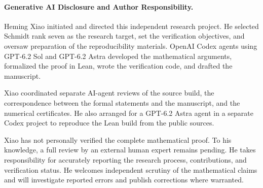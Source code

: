 \documentclass[11pt]{article}
\begin{document}
\newpage
\paragraph{Generative AI Disclosure and Author Responsibility.}
Heming Xiao initiated and directed this independent research project.
He selected Schmidt rank seven as the research target, set the verification
objectives, and oversaw preparation of the reproducibility materials.
OpenAI Codex agents using GPT-6.2 Sol and GPT-6.2 Astra developed the
mathematical arguments, formalized the proof in Lean, wrote the
verification code, and drafted the manuscript.

Xiao coordinated separate AI-agent reviews of the source build, the
correspondence between the formal statements and the manuscript,
and the numerical certificates. He also arranged for a GPT-6.2 Astra
agent in a separate Codex project to reproduce the Lean build from the
public sources.

Xiao has not personally verified the complete mathematical proof.
To his knowledge, a full review by an external human expert remains
pending. He takes responsibility for accurately reporting the research
process, contributions, and verification status. He welcomes independent
scrutiny of the mathematical claims and will investigate reported errors
and publish corrections where warranted.
\end{document}
